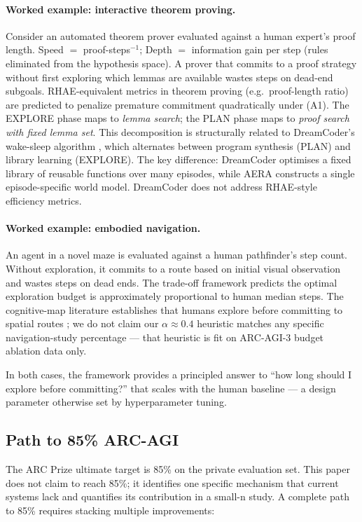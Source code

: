 \documentclass[11pt]{article}
\begin{document}
\paragraph{Worked example: interactive theorem proving.} Consider an automated theorem prover evaluated against a human expert's proof length. Speed $=$ proof-steps$^{-1}$; Depth $=$ information gain per step (rules eliminated from the hypothesis space). A prover that commits to a proof strategy without first exploring which lemmas are available wastes steps on dead-end subgoals. RHAE-equivalent metrics in theorem proving (e.g.\ proof-length ratio) are predicted to penalize premature commitment quadratically under (A1). The EXPLORE phase maps to \emph{lemma search}; the PLAN phase maps to \emph{proof search with fixed lemma set}. This decomposition is structurally related to DreamCoder's wake-sleep algorithm \cite{ellis2021}, which alternates between program synthesis (PLAN) and library learning (EXPLORE). The key difference: DreamCoder optimises a fixed library of reusable functions over many episodes, while AERA constructs a single episode-specific world model. DreamCoder does not address RHAE-style efficiency metrics.

\paragraph{Worked example: embodied navigation.} An agent in a novel maze is evaluated against a human pathfinder's step count. Without exploration, it commits to a route based on initial visual observation and wastes steps on dead ends. The trade-off framework predicts the optimal exploration budget is approximately proportional to human median steps. The cognitive-map literature establishes that humans explore before committing to spatial routes \cite{tolman1948,okeefe1978}; we do not claim our $\alpha \approx 0.4$ heuristic matches any specific navigation-study percentage --- that heuristic is fit on ARC-AGI-3 budget ablation data only.

In both cases, the framework provides a principled answer to ``how long should I explore before committing?'' that scales with the human baseline --- a design parameter otherwise set by hyperparameter tuning.

\subsection{Path to 85\% ARC-AGI}

The ARC Prize ultimate target is 85\% on the private evaluation set. This paper does not claim to reach 85\%; it identifies one specific mechanism that current systems lack and quantifies its contribution in a small-n study. A complete path to 85\% requires stacking multiple improvements:
\end{document}

